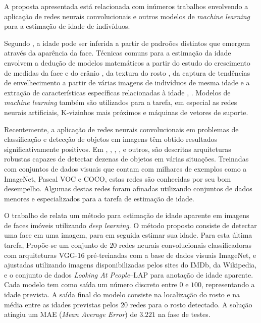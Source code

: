 A proposta apresentada está relacionada com inúmeros trabalhos envolvendo a aplicação de redes neurais convolucionais e outros modelos de \emph{machine learning} para a estimação de idade de indivíduos.

Segundo \cite{fu2010age}, a idade pode ser inferida a partir de padroões distintos que emergem através da aparência da face. Técnicas comuns para a estimação da idade envolvem a dedução de modelos matemáticos a partir do estudo do crescimento de medidas da face e do crânio \cite{kwon1999age}, da textura do rosto \cite{lanitis2002toward}, da captura de tendências de envelhecimento a partir de várias imagens de indivíduos de mesma idade \cite{fu2007estimating} e a extração de características específicas relacionadas à idade \cite{suo2008design}, \cite{lou2018expression}. Modelos de \emph{machine learning} também são utilizados para a tarefa, em especial as redes neurais artificiais, K-vizinhos mais próximos e máquinas de vetores de suporte.

Recentemente, a aplicação de redes neurais convolucionais em problemas de classificação e detecção de objetos em imagens têm obtido resultados significativamente positivos. Em \cite{vggnet}, \cite{resnet}, \cite{inception}, \cite{redmon2016you}, \cite{ssd} e outros, são descritas arquiteturas robustas capazes de detectar dezenas de objetos em várias situações. Treinadas com conjuntos de dados visuais que contam com milhares de exemplos como a ImageNet, Pascal VOC e COCO, estas redes são conhecidas por seu bom desempelho. Algumas destas redes foram afinadas utilizando conjuntos de dados menores e especializados para a tarefa de estimação de idade.

O trabalho de \cite{rothe2015dex} relata um método para estimação de idade aparente em imagens de faces imóveis utilizando \emph{deep learning}. O método proposto consiste de detectar uma face em uma imagem, para em seguida estimar sua idade. Para esta última tarefa, Propõe-se um conjunto de $20$ redes neurais convolucionais classificadoras com arquiteturas VGG-16 pré-treinadas com a base de dados visuais ImageNet, e ajustadas utilizando imagens disponibilizadas pelos sites do IMDb, da Wikipedia, e o conjunto de dados \emph{Looking At People}--LAP para anotação de idade aparente. Cada modelo tem como saída um número discreto entre $0$ e $100$, representando a idade prevista. A saída final do modelo consiste na localização do rosto e na média entre as idades previstas pelos $20$ redes para o rosto detectado. A solução atingiu um MAE (\emph{Mean Average Error}) de $3.221$ na fase de testes.


